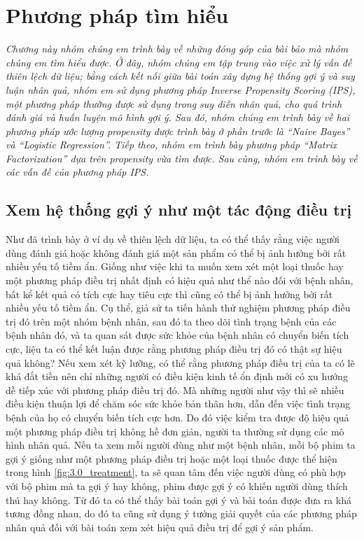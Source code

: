 \chapter{Phương pháp tìm hiểu}
\label{Chapter3}

\noindent\textit{Chương này nhóm chúng em trình bày về những đóng góp của bài báo mà nhóm chúng em tìm hiểu được. Ở đây, nhóm chúng em tập trung vào việc xử lý vấn đề thiên lệch dữ liệu; bằng cách kết nối giữa bài toán xây dựng hệ thống gợi ý và suy luận nhân quả, nhóm em sử dụng phương pháp Inverse Propensity Scoring (IPS), một phương pháp thường được sử dụng trong suy diễn nhân quả, cho quá trình đánh giá và huấn luyện mô hình gợi ý. Sau đó, nhóm chúng em trình bày về hai phương pháp ước lượng propensity được trình bày ở phần trước là ``Naive Bayes'' và ``Logistic Regression''. Tiếp theo, nhóm em trình bày phương pháp ``Matrix Factorization'' dựa trên propensity vừa tìm được. Sau cùng, nhóm em trình bày về các vấn đề của phương pháp IPS.}

\section{Xem hệ thống gợi ý như một tác động điều trị}

Như đã trình bày ở ví dụ về thiên lệch dữ liệu, ta có thể thấy rằng việc người dùng đánh giá hoặc không đánh giá một sản phẩm có thể bị ảnh hưởng bởi rất nhiều yếu tố tiềm ẩn. Giống như việc khi ta muốn xem xét một loại thuốc hay một phương pháp điều trị nhất định có hiệu quả như thể nào đối với bệnh nhân, bất kể kết quả có tích cực hay tiêu cực thì cũng có thể bị ảnh hưởng bởi rất nhiều yếu tố tiềm ẩn. Cụ thể, giả sử ta tiến hành thử nghiệm phương pháp điều trị đó trên một nhóm bệnh nhân, sau đó ta theo dõi tình trạng bệnh của các bệnh nhân đó, và ta quan sát được sức khỏe của bệnh nhân có chuyển biến tích cực, liệu ta có thể kết luận được rằng phương pháp điều trị đó có thật sự hiệu quả không? Nếu xem xét kỹ lưỡng, có thể rằng phương pháp điều trị của ta có lẽ  khá đắt tiền nên chỉ những người có điều kiện kinh tế ổn định mới có xu hướng dễ tiếp xúc với phương pháp điều trị đó. Mà những người như vậy thì sẽ nhiều điều kiện thuận lợi để chăm sóc sức khỏe bản thân hơn, dẫn đến việc tình trạng bệnh của họ có chuyển biến tích cực hơn. Do đó việc kiểm tra được độ hiệu quả một phương pháp điều trị không hề đơn giản, người ta thường sử dụng các mô hình nhân quả. Nếu ta xem mỗi người dùng như một bệnh nhân, mỗi bộ phim ta gợi ý giống như một phương pháp điều trị hoặc một loại thuốc được thể hiện trong hình \ref{fig:3.0_treatment}, ta sẽ quan tâm đến việc người dùng có phù hợp với bộ phim mà ta gợi ý hay không, phim được gợi ý có khiến người dùng thích thú hay không. Từ đó ta có thể thấy bài toán gợi ý và bài toán được đưa ra khá tương đồng nhau, do đó ta cũng sử dụng ý tưởng giải quyết của các phương pháp nhân quả đối với bài toán xem xét hiệu quả điều trị để gợi ý sản phẩm.

